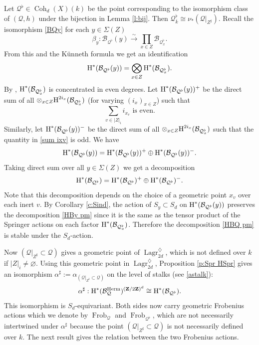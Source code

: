 \documentclass[reqno]{amsart}
\numberwithin{equation}{section}
\newcommand{\Z}{\mathbf{Z}}
\DeclareMathOperator{\gFrob}{Frob}
\DeclareMathOperator{\Herm}{Herm}
\DeclareMathOperator{\Lagr}{Lagr}
\DeclareMathOperator{\Coh}{Coh}
\newcommand\Sig{\Sigma}
\newcommand{\isom}{\stackrel{\sim}{\to}}
\newcommand{\ov}{\overline}
\newcommand\op{\oplus}
\newcommand\ot{\otimes}
\newcommand\vn{\varnothing}
\newcommand{\cohog}[2]{\textup{H}^{#1}({#2})}     %
\renewcommand\a\alpha
\renewcommand\b\beta
\newcommand\dm{\diamondsuit}
\newcommand\sh{\sharp}
\newcommand\cB{\mathcal{B}}
\newcommand\cQ{\mathcal{Q}}
\theoremstyle{remark}
\numberwithin{equation}{section}
\begin{document}
Let $\cQ^{\flat}\in \Coh_{d}(X)(k)$ be the point corresponding to the isomorphism class of $(\cQ,h)$ under the bijection in  Lemma \ref{l:bij}. Then $\cQ^{\flat}_{\ov k}\cong\nu_{*}(\cQ|_{Z^{\sh}})$. Recall the isomorphism \eqref{BQy} for each $y\in \Sig(Z)$
\begin{equation*}
\b_{y}: \cB_{\cQ^{\flat}}(y)\isom \prod_{x\in Z}\cB_{\cQ^{\flat}_{x}}.
\end{equation*}
From this and the K\"unneth formula we get an identification
\begin{equation*}
\cohog{*}{\cB_{\cQ^{\flat}}(y)}=\bigotimes_{x\in Z} \cohog{*}{\cB_{\cQ^{\flat}_{x}}}.
\end{equation*}
By \cite[Corollary 2.3(1)]{HS77}, $\cohog{*}{\cB_{\cQ^{\flat}_{x}}}$ is concentrated in even degrees. Let $\cohog{*}{\cB_{\cQ^{\flat}}(y)}^{+}$ be the direct sum of all $\ot_{x\in Z} \cohog{2i_{x}}{\cB_{\cQ^{\flat}_{x}}}$ (for varying $(i_{x})_{x\in Z}$) such that 
\begin{equation}\label{sum ixv}
\mbox{$\sum_{v\in|Z|_{i}}i_{x_{v}}$ is even.}
\end{equation}
Similarly, let $\cohog{*}{\cB_{\cQ^{\flat}}(y)}^{-}$ be the direct sum of all $\ot_{x\in Z} \cohog{2i_{x}}{\cB_{\cQ^{\flat}_{x}}}$ such that the  quantity in \eqref{sum ixv} is odd. We have
\begin{equation}\label{HBy pm}
\cohog{*}{\cB_{\cQ^{\flat}}(y)}=\cohog{*}{\cB_{\cQ^{\flat}}(y)}^{+}\op\cohog{*}{\cB_{\cQ^{\flat}}(y)}^{-}.
\end{equation}
Taking direct sum over all $y\in \Sig(Z)$ we get a decomposition
\begin{equation}\label{HBQ pm}
\cohog{*}{\cB_{\cQ^{\flat}}}=\cohog{*}{\cB_{\cQ^{\flat}}}^{+}\op\cohog{*}{\cB_{\cQ^{\flat}}}^{-}.
\end{equation}
Note that this decomposition depends on the choice of a geometric point $x_{v}$ over each inert $v$. By Corollary \ref{c:Sind}, the action of $S_{y}\subset S_{d}$ on $\cohog{*}{\cB_{\cQ^{\flat}}(y)}$ preserves the decomposition \eqref{HBy pm} since it is the same as the tensor product of the Springer actions on each factor $\cohog{*}{\cB_{\cQ^{\flat}_{x}}}$. Therefore the decomposition \eqref{HBQ pm} is stable under the $S_{d}$-action. 

Now $(\cQ|_{Z^{\sh}}\subset \cQ)$ gives a geometric point of $\Lagr^{\dm}_{2d}$, which is not defined over $k$ if $|Z|_{i}\ne\vn$.  Using this geometric point in $\Lagr^{\dm}_{2d}$, Proposition \ref{p:Spr HSpr} gives an isomorphism $\a^{\sh}:=\a_{(\cQ|_{Z^{\sh}}\subset\cQ)}$ on the level of stalks (see \eqref{astalk}):
\begin{equation*}
\a^{\sh}: \cohog{*}{\cB_{\cQ}^{\Herm}}^{(\Z/2\Z)^{d}}\cong \cohog{*}{\cB_{\cQ^{\flat}}}.
\end{equation*}
This isomorphism is $S_{d}$-equivariant. Both sides now carry geometric Frobenius actions which we denote by $\gFrob_{\cQ}$ and $\gFrob_{\cQ^{\flat}}$, which are not necessarily intertwined under $\a^{\sh}$ because the point $(\cQ|_{Z^{\sh}}\subset \cQ)$ is not necessarily defined over $k$. The next result gives the relation between the two Frobenius actions.
\end{document}
